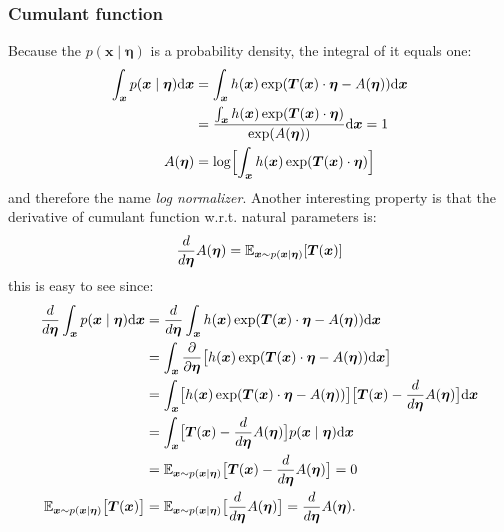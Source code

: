 \subsubsection{Cumulant function}
Because the $p(\boldsymbol{x}\mid \boldsymbol{\eta})$ is a probability density, the integral of it equals one:
\begin{align}
    \int_{\boldsymbol{x}} p(\boldsymbol{x}\mid \boldsymbol{\eta}) \mbox{\rm d}\boldsymbol{x} &= \int_{\boldsymbol{x}} h(\boldsymbol{x}) \exp( \boldsymbol{T}(\boldsymbol{x}) \cdot \boldsymbol{\eta} - A(\boldsymbol{\eta})) \mbox{\rm d}\boldsymbol{x} \notag  \\
    &=  \frac{ \int_{\boldsymbol{x}}  h(\boldsymbol{x})\exp( \boldsymbol{T}(\boldsymbol{x}) \cdot \boldsymbol{\eta})}{\exp(A(\boldsymbol{\eta}))}  \mbox{\rm d}\boldsymbol{x} = 1  \notag\\
    A(\boldsymbol{\eta}) &= \log\Bigl[ \int_{\boldsymbol{x}} h(\boldsymbol{x})\exp( \boldsymbol{T}(\boldsymbol{x}) \cdot \boldsymbol{\eta})\Bigr] \label{eq:log_norm}
\end{align}
and therefore the name \textit{log normalizer}. Another interesting property is that the derivative of cumulant function w.r.t. natural parameters is:
$$
\frac{d}{d \boldsymbol{\eta}} A(\boldsymbol{\eta}) = \operatorname{\mathbb{E}}_{\boldsymbol{x} \sim p(\boldsymbol{x}\mid \boldsymbol{\eta})} [\boldsymbol{T}(\boldsymbol{x})]
$$
this is easy to see since:
\begin{align*}
    \frac{d}{d \boldsymbol{\eta}} \int_{\boldsymbol{x}} p(\boldsymbol{x}\mid \boldsymbol{\eta}) \mbox{\rm d}\boldsymbol{x}&= \frac{d}{d \boldsymbol{\eta}}   \int_{\boldsymbol{x}} h(\boldsymbol{x}) \exp( \boldsymbol{T}(\boldsymbol{x}) \cdot \boldsymbol{\eta} - A(\boldsymbol{\eta})) \mbox{\rm d}\boldsymbol{x} \\
    &=\int_{\boldsymbol{x}}  \frac{\partial}{\partial \boldsymbol{\eta}} \bigl[h(\boldsymbol{x}) \exp( \boldsymbol{T}(\boldsymbol{x}) \cdot \boldsymbol{\eta} - A(\boldsymbol{\eta})) \mbox{\rm d}\boldsymbol{x} \bigr]  \\
    &=\int_{\boldsymbol{x}}  \bigl[h(\boldsymbol{x}) \exp( \boldsymbol{T}(\boldsymbol{x}) \cdot \boldsymbol{\eta} - A(\boldsymbol{\eta})) \bigr] \bigl[ \boldsymbol{T}(\boldsymbol{x}) - \frac{d}{d\boldsymbol{\eta}} A(\boldsymbol{\eta}) \bigr]\mbox{\rm d}\boldsymbol{x} \\
    &=\int_{\boldsymbol{x}}  \bigl[\boldsymbol{T}(\boldsymbol{x}) - \frac{d}{d\boldsymbol{\eta}} A(\boldsymbol{\eta})\bigr] p(\boldsymbol{x}\mid \boldsymbol{\eta}) \mbox{\rm d}\boldsymbol{x}  \\
    &=\operatorname{\mathbb{E}}_{\boldsymbol{x} \sim p(\boldsymbol{x}\mid \boldsymbol{\eta})}\bigl[\boldsymbol{T}(\boldsymbol{x}) - \frac{d}{d\boldsymbol{\eta}} A(\boldsymbol{\eta}) \bigr] = 0 \\
    \operatorname{\mathbb{E}}_{\boldsymbol{x} \sim p(\boldsymbol{x}\mid \boldsymbol{\eta})}\bigl[\boldsymbol{T}(\boldsymbol{x})\bigr] &= \operatorname{\mathbb{E}}_{\boldsymbol{x} \sim p(\boldsymbol{x}\mid \boldsymbol{\eta})} \bigl[\frac{d}{d\boldsymbol{\eta}} A(\boldsymbol{\eta}) \bigr] = \frac{d}{d\boldsymbol{\eta}} A(\boldsymbol{\eta}).
\end{align*}
